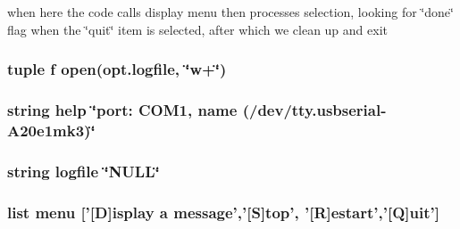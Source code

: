 when here the code calls display menu then processes selection, looking for \char`\"{}done\char`\"{} flag when the \char`\"{}quit\char`\"{} item is selected, after which we clean up and exit 

\hypertarget{namespace_lab1__483__pyinterface_a85d897846bb64fe74a8ce36c2365e3b8}{
\subsubsection[{f}]{\setlength{\rightskip}{0pt plus 5cm}tuple f open(opt.\-logfile, \char`\"{}w+\char`\"{})}}\label{namespace_lab1__483__pyinterface_a85d897846bb64fe74a8ce36c2365e3b8}
\hypertarget{namespace_lab1__483__pyinterface_abcce2312b2278db095fe85eb2260cb84}{
\subsubsection[{help}]{\setlength{\rightskip}{0pt plus 5cm}string help \char`\"{}port\-: C\-O\-M1, {\bf name} (/dev/tty.\-usbserial-\/A20e1mk3)\char`\"{}}}\label{namespace_lab1__483__pyinterface_abcce2312b2278db095fe85eb2260cb84}
\hypertarget{namespace_lab1__483__pyinterface_ab8da723c3b7bcac2541f0d4a6c8d3c0d}{
\subsubsection[{logfile}]{\setlength{\rightskip}{0pt plus 5cm}string logfile \char`\"{}N\-U\-L\-L\char`\"{}}}\label{namespace_lab1__483__pyinterface_ab8da723c3b7bcac2541f0d4a6c8d3c0d}
\hypertarget{namespace_lab1__483__pyinterface_ad668d4209789f3d31fa33f9d7c6ba43e}{
\subsubsection[{menu}]{\setlength{\rightskip}{0pt plus 5cm}list menu \mbox{[}'\mbox{[}D\mbox{]}isplay a message','\mbox{[}S\mbox{]}top', '\mbox{[}R\mbox{]}estart','\mbox{[}Q\mbox{]}uit'\mbox{]}}}\label{namespace_lab1__483__pyinterface_ad668d4209789f3d31fa33f9d7c6ba43e}
